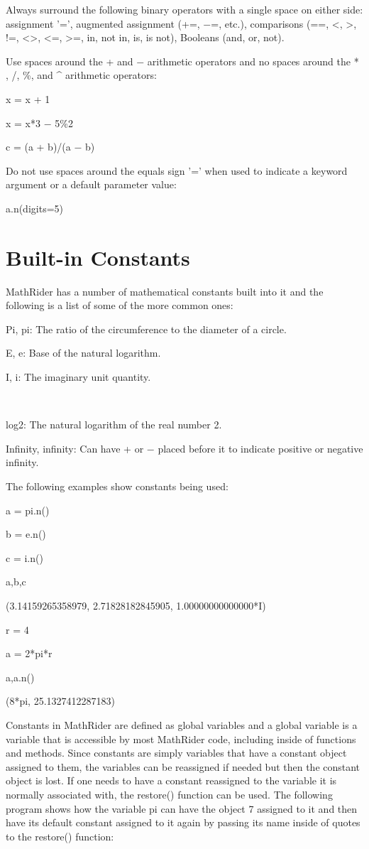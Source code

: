 \documentclass[12pt,oneside]{book}
\begin{document}
Always surround the following binary operators with a single space on either side: assignment '=', augmented assignment (+=, $-$=, etc.), comparisons (==, {\textless}, {\textgreater}, !=, {\textless}{\textgreater}, {\textless}=, {\textgreater}=, in, not in, is, is not), Booleans (and, or, not). 

Use spaces around the + and $-$ arithmetic operators and no spaces around the * , /, \%, and \^{} arithmetic operators:

x = x + 1

x = x*3 $-$ 5\%2

c = (a + b)/(a $-$ b)


Do not use spaces around the equals sign '=' when used to indicate a keyword argument or a default parameter value:

a.n(digits=5)

\section[Built{}-in Constants]{Built{}-in Constants}

MathRider has a number of mathematical constants built into it and the following is a list of some of the more common ones: 

Pi, pi: The ratio of the circumference to the diameter of a circle.


E, e: Base of the natural logarithm.


I, i: The imaginary unit quantity.

\ \ \ \ \ 

log2: The natural logarithm of the real number 2.


Infinity, infinity: Can have + or $-$ placed before it to indicate positive or negative infinity. 

The following examples show constants being used:


a = pi.n()

b = e.n()

c = i.n()

a,b,c

{\textbar}

(3.14159265358979, 2.71828182845905, 1.00000000000000*I)


r = 4

a = 2*pi*r

a,a.n()

{\textbar}

(8*pi, 25.1327412287183)

Constants in MathRider are defined as global variables and a global variable is a variable that is accessible by most MathRider code, including inside of functions and methods. Since constants are simply variables that have a constant object assigned to them, the variables can be reassigned if needed but then the constant object is lost. If one needs to have a constant reassigned to the variable it is normally associated with, the restore() function can be used. The following program shows how the variable pi can have the object 7 assigned to it and then have its default constant assigned to it again by passing its name inside of quotes to the restore() function: 
\end{document}
